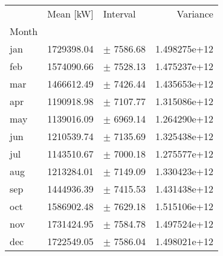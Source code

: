 \begin{tabular}{lllr}
\toprule
{} &   Mean [kW] &        Interval &     Variance  \\
Month &             &                 &               \\
\midrule
jan   &  1729398.04 &   $\pm$ 7586.68 &  1.498275e+12 \\
feb   &  1574090.66 &   $\pm$ 7528.13 &  1.475237e+12 \\
mar   &  1466612.49 &   $\pm$ 7426.44 &  1.435653e+12 \\
apr   &  1190918.98 &   $\pm$ 7107.77 &  1.315086e+12 \\
may   &  1139016.09 &   $\pm$ 6969.14 &  1.264290e+12 \\
jun   &  1210539.74 &   $\pm$ 7135.69 &  1.325438e+12 \\
jul   &  1143510.67 &   $\pm$ 7000.18 &  1.275577e+12 \\
aug   &  1213284.01 &   $\pm$ 7149.09 &  1.330423e+12 \\
sep   &  1444936.39 &   $\pm$ 7415.53 &  1.431438e+12 \\
oct   &  1586902.48 &   $\pm$ 7629.18 &  1.515106e+12 \\
nov   &  1731424.95 &   $\pm$ 7584.78 &  1.497524e+12 \\
dec   &  1722549.05 &   $\pm$ 7586.04 &  1.498021e+12 \\
\bottomrule
\end{tabular}
